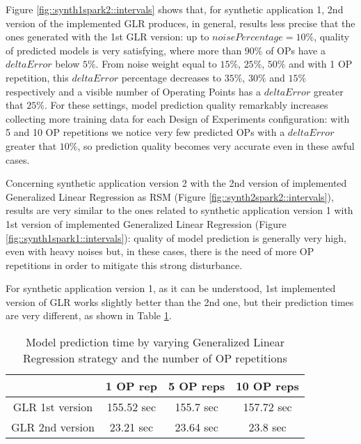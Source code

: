 Figure \ref{fig::synth1spark2::intervals} shows that, for synthetic application 1, 2nd version of the implemented GLR produces, in general, results less precise that the ones generated with the 1st GLR version: up to $noisePercentage = 10\%$, quality of predicted models is very satisfying, where more than $90\%$ of OPs have a $deltaError$ below $5\%$. From noise weight equal to $15\%$, $25\%$, $50\%$ and with 1 OP repetition, this $deltaError$ percentage decreases to $35\%$, $30\%$ and $15\%$ respectively and a visible number of Operating Points has a $deltaError$ greater that $25\%$. For these settings, model prediction quality remarkably increases collecting more training data for each Design of Experiments configuration: with 5 and 10 OP repetitions we notice very few predicted OPs with a $deltaError$ greater that $10\%$, so prediction quality becomes very accurate even in these awful cases.

Concerning synthetic application version 2 with the 2nd version of implemented Generalized Linear Regression as RSM (Figure \ref{fig::synth2spark2::intervals}), results are very similar to the ones related to synthetic application version 1 with 1st version of implemented Generalized Linear Regression (Figure \ref{fig::synth1spark1::intervals}): quality of model prediction is generally very high, even with heavy noises but, in these cases, there is the need of more OP repetitions in order to mitigate this strong disturbance.

For synthetic application version 1, as it can be understood, 1st implemented version of GLR works slightly better than the 2nd one, but their prediction times are very different, as shown in Table \ref{tab::GLRtimes}.

\begin{table}[htb]

    \centering
    
    \begin{tabular}{cccc}
    
        \toprule
         & 1 OP rep & 5 OP reps & 10 OP reps \\
        \midrule
        GLR 1st version & 155.52 sec & 155.7 sec & 157.72 sec \\
        GLR 2nd version & 23.21 sec & 23.64 sec & 23.8 sec \\
        \bottomrule 
    
    \end{tabular}

    \caption{Model prediction time by varying Generalized Linear Regression strategy and the number of OP repetitions}
    \label{tab::GLRtimes}
    
\end{table}

